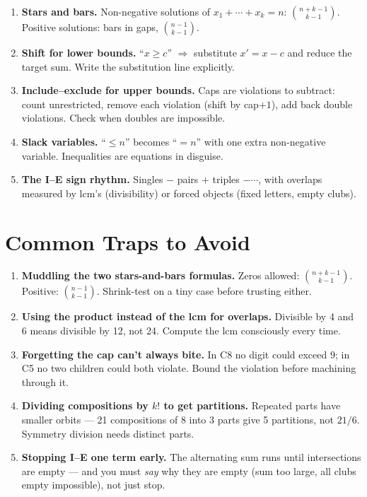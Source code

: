 \documentclass[11pt,a4paper]{article}
\begin{document}
\begin{enumerate}[leftmargin=2em, itemsep=4pt]
  \item \textbf{Stars and bars.} Non-negative solutions of $x_1+\cdots+x_k=n$: $\binom{n+k-1}{k-1}$. Positive solutions: bars in gaps, $\binom{n-1}{k-1}$. 
  \item \textbf{Shift for lower bounds.} ``$x\geq c$'' $\Rightarrow$ substitute $x'=x-c$ and reduce the target sum. Write the substitution line explicitly. 
  \item \textbf{Include--exclude for upper bounds.} Caps are violations to subtract: count unrestricted, remove each violation (shift by cap$+1$), add back double violations. Check when doubles are impossible. 
  \item \textbf{Slack variables.} ``$\leq n$'' becomes ``$=n$'' with one extra non-negative variable. Inequalities are equations in disguise. 
  \item \textbf{The I--E sign rhythm.} Singles $-$ pairs $+$ triples $-\cdots$, with overlaps measured by lcm's (divisibility) or forced objects (fixed letters, empty clubs). 
\end{enumerate}

\section*{Common Traps to Avoid}

\begin{enumerate}[leftmargin=2em, itemsep=4pt]
  \item \textbf{Muddling the two stars-and-bars formulas.} Zeros allowed: $\binom{n+k-1}{k-1}$. Positive: $\binom{n-1}{k-1}$. Shrink-test on a tiny case before trusting either. 
  \item \textbf{Using the product instead of the lcm for overlaps.} Divisible by 4 and 6 means divisible by 12, not 24. Compute the lcm consciously every time. 
  \item \textbf{Forgetting the cap can't always bite.} In C8 no digit could exceed 9; in C5 no two children could both violate. Bound the violation before machining through it. 
  \item \textbf{Dividing compositions by $k!$ to get partitions.} Repeated parts have smaller orbits --- 21 compositions of 8 into 3 parts give 5 partitions, not $21/6$. Symmetry division needs distinct parts. 
  \item \textbf{Stopping I--E one term early.} The alternating sum runs until intersections are empty --- and you must \emph{say} why they are empty (sum too large, all clubs empty impossible), not just stop. 
\end{enumerate}

\end{document}
